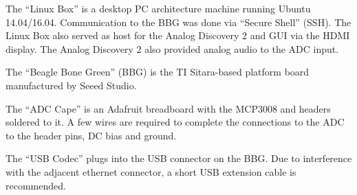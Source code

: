 The ``Linux Box'' is a desktop PC architecture machine running Ubuntu 14.04/16.04.  Communication to the BBG was done via ``Secure Shell'' (SSH).  The Linux Box also served as host for the Analog Discovery 2 and GUI via the HDMI display.  The Analog Discovery 2 also provided analog audio to the ADC input.

The ``Beagle Bone Green'' (BBG) is the TI Sitara-based platform board manufactured by Seeed Studio.

The ``ADC Cape'' is an Adafruit breadboard with the MCP3008 and headers soldered to it.  A few wires are required to complete the connections to the ADC to the header pins, DC bias and ground.

The ``USB Codec'' plugs into the USB connector on the BBG.  Due to interference with the adjacent ethernet connector, a short USB extension cable is recommended.





